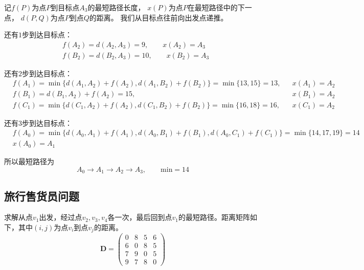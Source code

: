 \documentclass[lang = cn, scheme = chinese, thmcnt = section]{elegantbook}
\newcommand{\bs}{\boldsymbol}          %
\begin{document}
\begin{solution}
	记$f(P)$为点$P$到目标点$A_3$的最短路径长度，
	$x(P)$为点$P$在最短路径中的下一点，
	$d(P,Q)$为点$P$到点$Q$的距离。
	我们从目标点往前向出发点递推。
	
	还有$1$步到达目标点：
	\begin{align*}
		& f(A_2)=d(A_2,A_3)=9,\qquad x(A_2)=A_3\\
		& f(B_2)=d(B_2,A_3)=10,\qquad x(B_2)=A_3
	\end{align*}

	还有$2$步到达目标点：
	\begin{align*}
		& f(A_1)
		=\min\{ d(A_1,A_2)+f(A_2),d(A_1,B_2)+f(B_2) \}
		=\min\{ 13,15 \}=13,
		 && x(A_1)=A_2\\
		& f(B_1)
		=d(B_1,A_2)+f(A_2)
		=15, && x(B_1)=A_2\\
		& f(C_1)
		=\min\{ d(C_1,A_2)+f(A_2),d(C_1,B_2)+f(B_2) \}
		=\min\{ 16,18 \}
		=16, && x(C_1)=A_2
	\end{align*}
	
	还有$3$步到达目标点：%
	\begin{align*}
		&f(A_0)
		=\min\{ d(A_0,A_1)+f(A_1),d(A_0,B_1)+f(B_1),d(A_0,C_1)+f(C_1) \}
		=\min\{ 14,17,19 \}
		=14\\
		& x(A_0)=A_1
	\end{align*}
	
	所以最短路径为%
	$$
	A_0\to A_1\to A_2\to A_3,\qquad \text{min}=14
	$$
\end{solution}

\subsection{旅行售货员问题}

\begin{example}
	求解从点$v_1$出发，经过点$v_2,v_3,v_4$各一次，最后回到点$v_1$的最短路径。距离矩阵如下，其中$(i,j)$为点$v_i$到点$v_j$的距离。%
	$$
	\bs{D}=\begin{pmatrix}
		0 & 8 & 5 & 6\\
		6 & 0 & 8 & 5\\
		7 & 9 & 0 & 5\\
		9 & 7 & 8 & 0
	\end{pmatrix}
	$$
\end{example}
\end{document}
